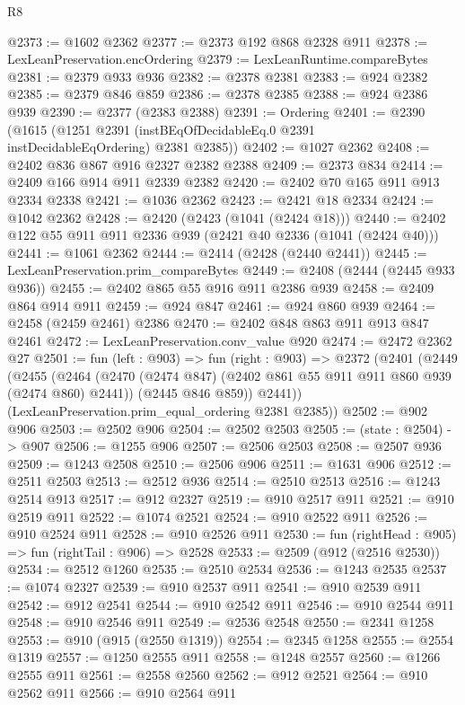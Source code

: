 \begin{lexlean}{R8}
\begin{coremodule}
@2373 := @1602 @2362
@2377 := @2373 @192 @868 @2328 @911
@2378 := LexLeanPreservation.encOrdering
@2379 := LexLeanRuntime.compareBytes
@2381 := @2379 @933 @936
@2382 := @2378 @2381
@2383 := @924 @2382
@2385 := @2379 @846 @859
@2386 := @2378 @2385
@2388 := @924 @2386 @939
@2390 := @2377 (@2383 @2388)
@2391 := Ordering
@2401 := @2390
    (@1615 (@1251 @2391 (instBEqOfDecidableEq.{0} @2391 instDecidableEqOrdering) @2381 @2385))
@2402 := @1027 @2362
@2408 := @2402 @836 @867 @916 @2327 @2382 @2388
@2409 := @2373 @834
@2414 := @2409 @166 @914 @911 @2339 @2382
@2420 := @2402 @70 @165 @911 @913 @2334 @2338
@2421 := @1036 @2362
@2423 := @2421 @18 @2334
@2424 := @1042 @2362
@2428 := @2420 (@2423 (@1041 (@2424 @18)))
@2440 := @2402 @122 @55 @911 @911 @2336 @939 (@2421 @40 @2336 (@1041 (@2424 @40)))
@2441 := @1061 @2362
@2444 := @2414 (@2428 (@2440 @2441))
@2445 := LexLeanPreservation.prim_compareBytes
@2449 := @2408 (@2444 (@2445 @933 @936))
@2455 := @2402 @865 @55 @916 @911 @2386 @939
@2458 := @2409 @864 @914 @911
@2459 := @924 @847
@2461 := @924 @860 @939
@2464 := @2458 (@2459 @2461) @2386
@2470 := @2402 @848 @863 @911 @913 @847 @2461
@2472 := LexLeanPreservation.conv_value @920
@2474 := @2472 @2362 @27
@2501 := fun (left : @903) =>
  fun (right : @903) =>
  @2372
    (@2401
      (@2449
        (@2455
          (@2464
            (@2470 (@2474 @847) (@2402 @861 @55 @911 @911 @860 @939 (@2474 @860) @2441))
            (@2445 @846 @859))
          @2441))
      (LexLeanPreservation.prim_equal_ordering @2381 @2385))
@2502 := @902 @906
@2503 := @2502 @906
@2504 := @2502 @2503
@2505 := (state : @2504) -> @907
@2506 := @1255 @906
@2507 := @2506 @2503
@2508 := @2507 @936
@2509 := @1243 @2508
@2510 := @2506 @906
@2511 := @1631 @906
@2512 := @2511 @2503
@2513 := @2512 @936
@2514 := @2510 @2513
@2516 := @1243 @2514 @913
@2517 := @912 @2327
@2519 := @910 @2517 @911
@2521 := @910 @2519 @911
@2522 := @1074 @2521
@2524 := @910 @2522 @911
@2526 := @910 @2524 @911
@2528 := @910 @2526 @911
@2530 := fun (rightHead : @905) => fun (rightTail : @906) => @2528
@2533 := @2509 (@912 (@2516 @2530))
@2534 := @2512 @1260
@2535 := @2510 @2534
@2536 := @1243 @2535
@2537 := @1074 @2327
@2539 := @910 @2537 @911
@2541 := @910 @2539 @911
@2542 := @912 @2541
@2544 := @910 @2542 @911
@2546 := @910 @2544 @911
@2548 := @910 @2546 @911
@2549 := @2536 @2548
@2550 := @2341 @1258
@2553 := @910 (@915 (@2550 @1319))
@2554 := @2345 @1258
@2555 := @2554 @1319
@2557 := @1250 @2555 @911
@2558 := @1248 @2557
@2560 := @1266 @2555 @911
@2561 := @2558 @2560
@2562 := @912 @2521
@2564 := @910 @2562 @911
@2566 := @910 @2564 @911

\end{coremodule}
\end{lexlean}
